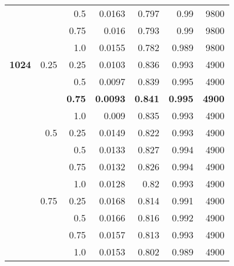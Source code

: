 \begin{table}[H]
\begin{tabular}{rrrrrrr}
              &               & 0.5           & 0.0163               & 0.797                   & 0.99                    & 9800          \\
              &               & 0.75          & 0.016                & 0.793                   & 0.99                    & 9800          \\
              &               & 1.0           & 0.0155               & 0.782                   & 0.989                   & 9800          \\
\textbf{1024} & 0.25          & 0.25          & 0.0103               & 0.836                   & 0.993                   & 4900          \\
              &               & 0.5           & 0.0097               & 0.839                   & 0.995                   & 4900          \\
              &               & \textbf{0.75} & \textbf{0.0093}      & \textbf{0.841}          & \textbf{0.995}          & \textbf{4900} \\
              &               & 1.0           & 0.009                & 0.835                   & 0.993                   & 4900          \\
              & 0.5           & 0.25          & 0.0149               & 0.822                   & 0.993                   & 4900          \\
              &               & 0.5           & 0.0133               & 0.827                   & 0.994                   & 4900          \\
              &               & 0.75          & 0.0132               & 0.826                   & 0.994                   & 4900          \\
              &               & 1.0           & 0.0128               & 0.82                    & 0.993                   & 4900          \\
              & 0.75          & 0.25          & 0.0168               & 0.814                   & 0.991                   & 4900          \\
              &               & 0.5           & 0.0166               & 0.816                   & 0.992                   & 4900          \\
              &               & 0.75          & 0.0157               & 0.813                   & 0.993                   & 4900          \\
              &               & 1.0           & 0.0153               & 0.802                   & 0.989                   & 4900          \\

\end{tabular}
\end{table}

